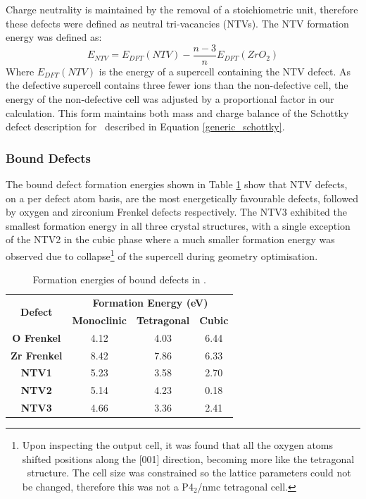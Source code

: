 Charge neutrality is maintained by the removal of a stoichiometric unit, therefore these defects were defined as neutral tri-vacancies (NTVs). The NTV formation energy was defined as:
\begin{equation}
\label{equation_NTV}
E_{NTV} = E_{DFT}(NTV) - \frac{n-3}{n}E_{DFT}(ZrO_2)%
\end{equation}
Where $E_{DFT}(NTV)$ is the energy of a supercell containing the NTV defect. As the defective supercell contains three fewer ions than the non-defective cell, the energy of the non-defective cell was adjusted by a proportional factor in our calculation. This form maintains both mass and charge balance of the Schottky defect description for \zirconia\ described in Equation \ref{generic_schottky}.

\subsubsection*{Bound Defects} \label{bound_defect}

The bound defect formation energies shown in Table \ref{table:bound_defects} show that NTV defects, on a per defect atom basis, are the most energetically favourable defects, followed by oxygen and zirconium Frenkel defects respectively. The NTV3 exhibited the smallest formation energy in all three crystal structures, with a single exception of the NTV2 in the cubic phase where a much smaller formation energy was observed due to collapse\footnote{Upon inspecting the output cell, it was found that all the oxygen atoms shifted positions along the [001] direction, becoming more like the tetragonal \zirconia\ structure. The cell size was constrained so the lattice parameters could not be changed, therefore this was not a P4$_{2}$/nmc tetragonal cell.} of the supercell during geometry optimisation. 

\begin{table}[ht] %
\onehalfspacing
\centering
\caption{Formation energies of bound defects in \zirconia.}
\label{table:bound_defects}
\begin{tabular}{cccc}
\hline
\multirow{2}{*}{\textbf{Defect}} & \multicolumn{3}{c}{\textbf{Formation Energy (eV)}} \\ \cline{2-4} 
 & \textbf{Monoclinic} & \textbf{Tetragonal} & \textbf{Cubic} \\ \hline
\textbf{O Frenkel} & 4.12 & 4.03 & 6.44 \\
\textbf{Zr Frenkel} & 8.42 & 7.86 & 6.33 \\
\textbf{NTV1} & 5.23 & 3.58 & 2.70 \\
\textbf{NTV2} & 5.14 & 4.23 & 0.18 \\
\textbf{NTV3} & 4.66 & 3.36 & 2.41 \\ \hline
\end{tabular}
\end{table}

